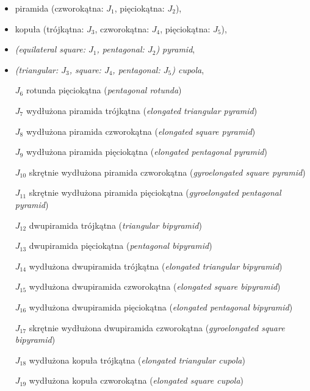 \begin{itemize}
    \item piramida (czworokątna: $J_1$, pięciokątna: $J_2$),
    \item kopuła (trójkątna: $J_3$, czworokątna: $J_4$, pięciokątna: $J_5$),
    \item \emph{(equilateral square: $J_1$, pentagonal: $J_2$) pyramid},
    \item \emph{(triangular: $J_3$, square: $J_4$, pentagonal: $J_5$) cupola},
    \item [$J_{6}$] {rotunda pięciokątna}
                     (\emph{pentagonal rotunda})
    \item [$J_{7}$] {wydłużona piramida trójkątna}
                     (\emph{elongated triangular pyramid})
    \item [$J_{8}$] {wydłużona piramida czworokątna}
                     (\emph{elongated square pyramid})
    \item [$J_{9}$] {wydłużona piramida pięciokątna}
                     (\emph{elongated pentagonal pyramid})
    \item [$J_{10}$] {skrętnie wydłużona piramida czworokątna}
                     (\emph{gyroelongated square pyramid})
    \item [$J_{11}$] {skrętnie wydłużona piramida pięciokątna}
                     (\emph{gyroelongated pentagonal pyramid})
    \item [$J_{12}$] {dwupiramida trójkątna}
                     (\emph{triangular bipyramid})
    \item [$J_{13}$] {dwupiramida pięciokątna}
                     (\emph{pentagonal bipyramid})
    \item [$J_{14}$] {wydłużona dwupiramida trójkątna}
                     (\emph{elongated triangular bipyramid})
    \item [$J_{15}$] {wydłużona dwupiramida czworokątna}
                     (\emph{elongated square bipyramid})
    \item [$J_{16}$] {wydłużona dwupiramida pięciokątna}
                     (\emph{elongated pentagonal bipyramid})
    \item [$J_{17}$] {skrętnie wydłużona dwupiramida czworokątna}
                     (\emph{gyroelongated square bipyramid})
    \item [$J_{18}$] {wydłużona kopuła trójkątna}
                     (\emph{elongated triangular cupola})
    \item [$J_{19}$] {wydłużona kopuła czworokątna}
                     (\emph{elongated square cupola})

\end{itemize}
